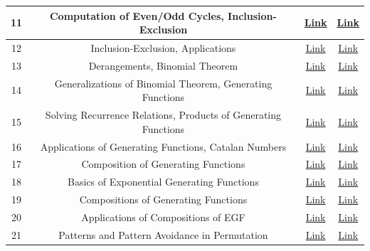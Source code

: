\documentclass[letterpaper]{article}
\begin{document}
\begin{center}
\begin{tabular}{|c|c|c|c|}
        \hline
        11 & Computation of Even/Odd Cycles, Inclusion-Exclusion & \href{http://cseweb.ucsd.edu/~dakane/Math184/Lec11.html}{Link} & \href{http://cseweb.ucsd.edu/~dakane/Math184/Lec11.pdf}{Link} \\ 
        \hline
        12 & Inclusion-Exclusion, Applications & \href{http://cseweb.ucsd.edu/~dakane/Math184/Lec12.html}{Link} & \href{http://cseweb.ucsd.edu/~dakane/Math184/Lec12.pdf}{Link} \\ 
        \hline
        13 & Derangements, Binomial Theorem & \href{http://cseweb.ucsd.edu/~dakane/Math184/Lec13.html}{Link} & \href{http://cseweb.ucsd.edu/~dakane/Math184/Lec13.pdf}{Link} \\ 
        \hline
        14 & Generalizations of Binomial Theorem, Generating Functions & \href{http://cseweb.ucsd.edu/~dakane/Math184/Lec14.html}{Link} & \href{http://cseweb.ucsd.edu/~dakane/Math184/Lec14.pdf}{Link} \\ 
        \hline
        15 & Solving Recurrence Relations, Products of Generating Functions & \href{http://cseweb.ucsd.edu/~dakane/Math184/Lec15.html}{Link} & \href{http://cseweb.ucsd.edu/~dakane/Math184/Lec15.pdf}{Link} \\ 
        \hline
        16 & Applications of Generating Functions, Catalan Numbers & \href{http://cseweb.ucsd.edu/~dakane/Math184/Lec16.html}{Link} & \href{http://cseweb.ucsd.edu/~dakane/Math184/Lec16.pdf}{Link} \\ 
        \hline
        17 & Composition of Generating Functions & \href{http://cseweb.ucsd.edu/~dakane/Math184/Lec17.html}{Link} & \href{http://cseweb.ucsd.edu/~dakane/Math184/Lec17.pdf}{Link} \\ 
        \hline
        18 & Basics of Exponential Generating Functions & \href{http://cseweb.ucsd.edu/~dakane/Math184/Lec18.html}{Link} & \href{http://cseweb.ucsd.edu/~dakane/Math184/Lec18.pdf}{Link} \\ 
        \hline
        19 & Compositions of Generating Functions & \href{http://cseweb.ucsd.edu/~dakane/Math184/Lec19.html}{Link} & \href{http://cseweb.ucsd.edu/~dakane/Math184/Lec19.pdf}{Link} \\ 
        \hline
        20 & Applications of Compositions of EGF & \href{http://cseweb.ucsd.edu/~dakane/Math184/Lec20.html}{Link} & \href{http://cseweb.ucsd.edu/~dakane/Math184/Lec20.pdf}{Link} \\ 
        \hline
        21 & Patterns and Pattern Avoidance in Permutation & \href{http://cseweb.ucsd.edu/~dakane/Math184/Lec21.html}{Link} & \href{http://cseweb.ucsd.edu/~dakane/Math184/Lec21.pdf}{Link} \\ 

\end{tabular}
\end{center}
\end{document}
